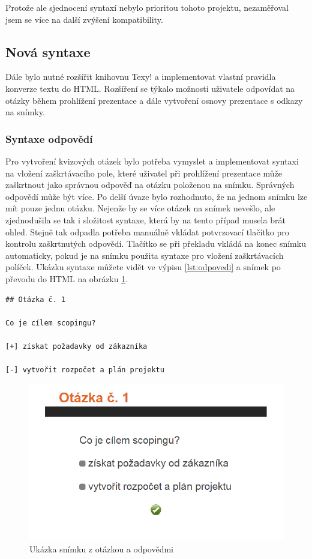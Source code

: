 \documentclass[11pt,twoside,a4paper]{book}
\begin{document}
Protože ale sjednocení syntaxí nebylo prioritou tohoto projektu, nezaměřoval jsem se více na další zvýšení kompatibility.


\subsection{Nová syntaxe}
Dále bylo nutné rozšířit knihovnu Texy! a implementovat vlastní pravidla konverze textu do HTML. Rozšíření se týkalo možnosti uživatele odpovídat na otázky během prohlížení prezentace a dále vytvoření osnovy prezentace s odkazy na snímky.

\subsubsection{Syntaxe odpovědí}
Pro vytvoření kvizových otázek bylo potřeba vymyslet a implementovat syntaxi na vložení zaškrtávacího pole, které uživatel při prohlížení prezentace může zaškrtnout jako správnou odpověď na otázku položenou na snímku. Správných odpovědí může být více. Po delší úvaze bylo rozhodnuto, že na jednom snímku lze mít pouze jednu otázku. Nejenže by se více otázek na snímek nevešlo, ale zjednodušila se tak i složitost syntaxe, která by na tento případ musela brát ohled. Stejně tak odpadla potřeba manuálně vkládat potvrzovací tlačítko pro kontrolu zaškrtnutých odpovědí. Tlačítko se při překladu vkládá na konec snímku automaticky, pokud je na snímku použita syntaxe pro vložení zaškrtávacích políček. Ukázku syntaxe můžete vidět ve výpisu \ref{lst:odpovedi} a snímek po převodu do HTML na obrázku \ref{fig:odpovedi}.

\begin{lstlisting}[caption={Ukázka zdrojového textu snímku s otázkou a odpovědmi},label={lst:odpovedi}]
## Otázka č. 1

Co je cílem scopingu?

[+] získat požadavky od zákazníka

[-] vytvořit rozpočet a plán projektu
\end{lstlisting}


\begin{figure}[ht]
	\begin{center}
		\includegraphics[width=14cm]{PRO-img/odpovedi.png}
		\caption{Ukázka snímku z otázkou a odpovědmi}
		\label{fig:odpovedi}
	\end{center}
\end{figure}
\end{document}
